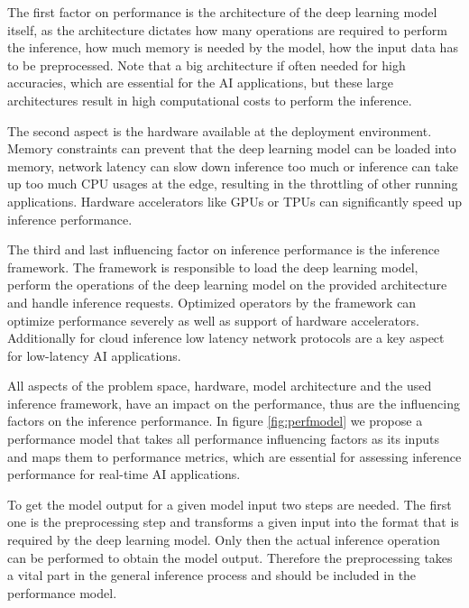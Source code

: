 The first factor on performance is the architecture of the deep learning model itself, as the architecture dictates how many operations are required to perform the inference, how much memory is needed by the model, how the input data has to be preprocessed.
Note that a big architecture if often needed for high accuracies, which are essential for the AI applications, but these large architectures result in high computational costs to perform the inference.

The second aspect is the hardware available at the deployment environment. 
Memory constraints can prevent that the deep learning model can be loaded into memory, network latency can slow down inference too much or inference can take up too much CPU usages at the edge, resulting in the throttling of other running applications.
Hardware accelerators like GPUs or TPUs can significantly speed up inference performance.

The third and last influencing factor on inference performance is the inference framework. 
The framework is responsible to load the deep learning model, perform the operations of the deep learning model on the provided architecture and handle inference requests.
Optimized operators by the framework can optimize performance severely as well as support of hardware accelerators.
Additionally for cloud inference low latency network protocols are a key aspect for low-latency AI applications.


All aspects of the problem space, hardware, model architecture and the used inference framework, have an impact on the performance, thus are the influencing factors on the inference performance.
In figure \ref{fig:perfmodel} we propose a performance model that takes all performance influencing factors as its inputs and maps them to performance metrics, which are essential for assessing inference performance for real-time AI applications.

To get the model output for a given model input two steps are needed. The first one is the preprocessing step and transforms a given input into the format that is required by the deep learning model. Only then the actual inference operation can be performed to obtain the model output. Therefore the preprocessing takes a vital part in the general inference process and should be included in the performance model.

